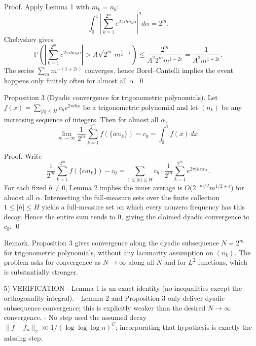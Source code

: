 Proof.
Apply Lemma 1 with $m_k=n_k$:
\[
\int_0^1 \left|\sum_{k=1}^{2^m} e^{2\pi i h n_k\alpha}\right|^2 d\alpha = 2^m.
\]
Chebyshev gives
\[
\mathbb{P}\left(\left|\sum_{k=1}^{2^m} e^{2\pi i h n_k\alpha}\right|>A\sqrt{2^m}\,m^{\frac12+\epsilon}\right)
\le \frac{2^m}{A^2 2^m m^{1+2\epsilon}}=\frac{1}{A^2 m^{1+2\epsilon}}.
\]
The series $\sum_m m^{-(1+2\epsilon)}$ converges, hence Borel--Cantelli implies the event happens only finitely often for almost all $\alpha$. \qed

Proposition 3 (Dyadic convergence for trigonometric polynomials).
Let $f(x)=\sum_{|h|\le H} c_h e^{2\pi i h x}$ be a trigonometric polynomial and let $(n_k)$ be any increasing sequence of integers.  Then for almost all $\alpha$,
\[
\lim_{m\to\infty}\frac{1}{2^m}\sum_{k=1}^{2^m} f(\{\alpha n_k\}) = c_0 = \int_0^1 f(x)\,dx.
\]

Proof.
Write
\[
\frac{1}{2^m}\sum_{k=1}^{2^m} f(\{\alpha n_k\}) - c_0
= \sum_{1\le |h|\le H} c_h \cdot \frac{1}{2^m}\sum_{k=1}^{2^m} e^{2\pi i h\alpha n_k}.
\]
For each fixed $h\neq 0$, Lemma 2 implies the inner average is $O\bigl(2^{-m/2} m^{1/2+\epsilon}\bigr)$ for almost all $\alpha$.  Intersecting the full-measure sets over the finite collection $1\le |h|\le H$ yields a full-measure set on which every nonzero frequency has this decay.  Hence the entire sum tends to $0$, giving the claimed dyadic convergence to $c_0$. \qed

Remark.
Proposition 3 gives convergence along the dyadic subsequence $N=2^m$ for trigonometric polynomials, without any lacunarity assumption on $(n_k)$.  The problem asks for convergence as $N\to\infty$ along all $N$ and for $L^2$ functions, which is substantially stronger.

5) VERIFICATION
- Lemma 1 is an exact identity (no inequalities except the orthogonality integral).
- Lemma 2 and Proposition 3 only deliver dyadic subsequence convergence; this is explicitly weaker than the desired $N\to\infty$ convergence.
- No step used the assumed decay $\|f-f_n\|_2\ll 1/(\log\log\log n)^C$; incorporating that hypothesis is exactly the missing step.

